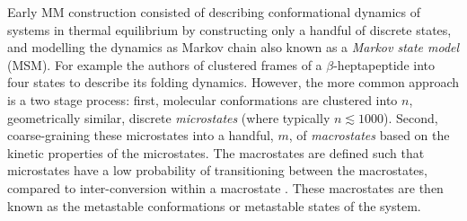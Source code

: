 Early MM construction consisted of describing conformational dynamics of systems in thermal equilibrium by constructing only a handful of discrete states, and modelling the dynamics as Markov chain also known as a \emph{Markov state model} (MSM). For example the authors of \cite{degrootEssentialDynamicsReversible2001} clustered frames of a $\beta$-heptapeptide into four states to describe its folding dynamics. However, the more common approach \cite{husicMarkovStateModels2018, noeMarkovModelsMolecular2019b} is a two stage process:  first, molecular conformations are clustered into $n$, geometrically similar, discrete \emph{microstates} (where typically $n \lesssim 1000$). Second, coarse-graining these microstates into a handful, $m$, of \emph{macrostates} based on the kinetic properties of the microstates.  The macrostates are defined such that microstates have a low probability of transitioning between the macrostates, compared to inter-conversion within a macrostate \cite{schutteDirectApproachConformational1999,swopeDescribingProteinFolding2004, prinzMarkovModelsMolecular2011}.  These macrostates are then known as the metastable conformations or metastable states of the system.  



